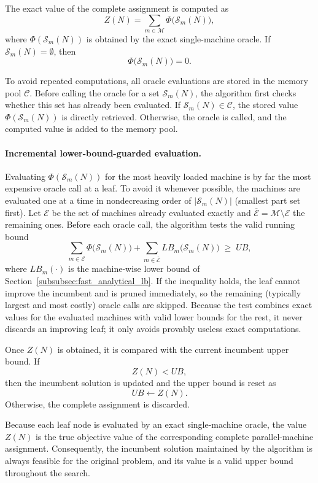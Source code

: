\documentclass[letterpaper, 10 pt, conference]{ieeeconf}  %
\begin{document}
The exact value of the complete assignment is computed as
\[
Z(N)
=
\sum_{m\in\mathcal{M}}
\Phi\bigl(\mathcal{S}_m(N)\bigr),
\]
where $\Phi(\mathcal{S}_m(N))$ is obtained by the exact single-machine
oracle. If $\mathcal{S}_m(N)=\emptyset$, then
\[
\Phi\bigl(\mathcal{S}_m(N)\bigr)=0.
\]

To avoid repeated computations, all oracle evaluations are stored in the
memory pool $\mathcal{C}$. Before calling the oracle for a set
$\mathcal{S}_m(N)$, the algorithm first checks whether this set has already
been evaluated. If $\mathcal{S}_m(N)\in\mathcal{C}$, the stored value
$\Phi(\mathcal{S}_m(N))$ is directly retrieved. Otherwise, the oracle is
called, and the computed value is added to the memory pool.


\paragraph*{Incremental lower-bound-guarded evaluation.}
Evaluating $\Phi(\mathcal{S}_m(N))$ for the most heavily loaded machine is by
far the most expensive oracle call at a leaf. To avoid it whenever possible,
the machines are evaluated one at a time in nondecreasing order of
$|\mathcal{S}_m(N)|$ (smallest part set first). Let $\mathcal{E}$ be the set of
machines already evaluated exactly and
$\overline{\mathcal{E}}=\mathcal{M}\setminus\mathcal{E}$ the remaining ones.
Before each oracle call, the algorithm tests the valid running bound
\[
\sum_{m\in\mathcal{E}}\Phi\bigl(\mathcal{S}_m(N)\bigr)
+\sum_{m\in\overline{\mathcal{E}}}LB_m\bigl(\mathcal{S}_m(N)\bigr)\;\ge\;UB,
\]
where $LB_m(\cdot)$ is the machine-wise lower bound of
Section~\ref{subsubsec:fast_analytical_lb}. If the inequality holds, the leaf
cannot improve the incumbent and is pruned immediately, so the remaining
(typically largest and most costly) oracle calls are skipped. Because the test
combines exact values for the evaluated machines with valid lower bounds for
the rest, it never discards an improving leaf; it only avoids provably useless
exact computations.

Once $Z(N)$ is obtained, it is compared with the current incumbent upper
bound. If
\[
Z(N)<UB,
\]
then the incumbent solution is updated and the upper bound is reset as
\[
UB\leftarrow Z(N).
\]
Otherwise, the complete assignment is discarded.

Because each leaf node is evaluated by an exact single-machine oracle, the
value $Z(N)$ is the true objective value of the corresponding complete
parallel-machine assignment. Consequently, the incumbent solution maintained
by the algorithm is always feasible for the original problem, and its value
is a valid upper bound throughout the search.
\end{document}
